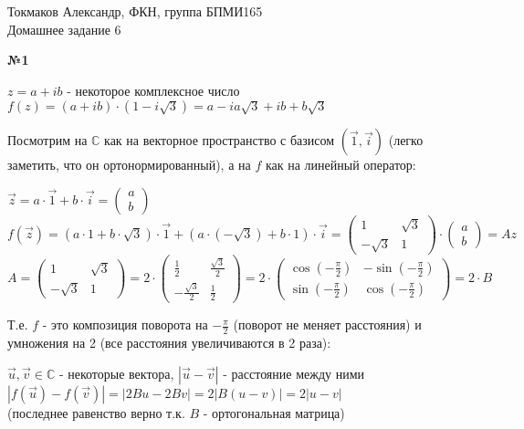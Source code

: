 \documentclass{article}
\newenvironment{task}{\begin{center}\fontsize{14}{14}\selectfont\bf}{\rm\fontsize{12}{12}\selectfont\end{center}}
\newcommand{\cvec}[1]{\left(\begin{array}{c} #1 \end{array}\right)}
\begin{document}
	\begin{center}
		Токмаков Александр, ФКН, группа БПМИ165 \\
		Домашнее задание 6
	\end{center}
	
	\begin{task} 
		№1
	\end{task}
	\begin{center}
		$z = a + ib$ - некоторое комплексное число \\
		$f(z) = (a + ib) \cdot (1 - i\sqrt{3}) = a - ia\sqrt{3} + ib + b\sqrt{3}$
	\end{center}
	Посмотрим на $\mathbb{C}$ как на векторное пространство с базисом $(\vec{1}, \vec{i})$ (легко заметить, что он ортонормированный), а на $f$ как на линейный оператор:
	\begin{center}
		$\vec{z} = a\cdot\vec{1} + b\cdot \vec{i} =  \cvec{a \\ b}$\\
		$f(\vec{z}) = (a\cdot 1 + b\cdot\sqrt{3})\cdot \vec{1} + (a \cdot (-\sqrt{3}) + b\cdot 1)\cdot\vec{i} 
		= \left(\begin{array}{cc} 1 & \sqrt{3} \\ -\sqrt{3} & 1 \end{array}\right) \cdot \cvec{a\\b} = Az$ \\
		$A =  \left(\begin{array}{cc} 1 & \sqrt{3} \\ -\sqrt{3} & 1 \end{array}\right) = 2\cdot\left(\begin{array}{cc} \frac{1}{2} & \frac{\sqrt{3}}{2} \\ -\frac{\sqrt{3}}{2} & \frac{1}{2} \end{array}\right)
		 = 2\cdot\left(\begin{array}{lr} \cos\left(-\frac{\pi}{2}\right) & -\sin\left(-\frac{\pi}{2}\right) \\ \sin\left(-\frac{\pi}{2}\right) & \cos\left(-\frac{\pi}{2}\right) \end{array}\right) = 2\cdot B$
	\end{center}
	Т.е. $f$ - это композиция поворота на $-\frac{\pi}{2}$ (поворот не меняет расстояния) и умножения на 2 (все расстояния увеличиваются в 2 раза):
	\begin{center}
		$\vec{u}, \vec{v} \in \mathbb{C}$ - некоторые вектора, $|\vec{u} - \vec{v}|$ - расстояние между ними \\
		$|f(\vec{u}) - f(\vec{v})| = |2Bu - 2Bv| = 2 |B(u - v)| = 2|u - v|$\\ (последнее равенство верно т.к. $B$ - ортогональная матрица)
	\end{center}
	
\end{document}
